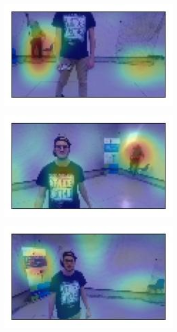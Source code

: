 \begin{figure}[!h]
	\begin{center}
		\begin{subfigure}[h]{0.24\textwidth}
			\centering
			\includegraphics[width=1\textwidth]{"contents/images/gradcam/gradcam-background-1"}
		\end{subfigure}
		\hfill
		\begin{subfigure}[h]{0.24\textwidth}
			\centering
			\includegraphics[width=1\textwidth]{"contents/images/gradcam/gradcam-background-2"}
		\end{subfigure}
		\hfill
		\begin{subfigure}[h]{0.24\textwidth}
			\centering
			\includegraphics[width=1\textwidth]{"contents/images/gradcam/gradcam-background-3"}

\end{subfigure}
\end{center}
\end{figure}
